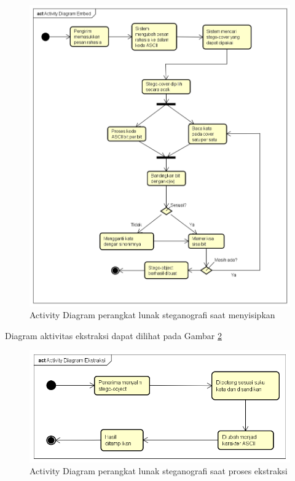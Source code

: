 \begin{figure}[H]
	\centering
	\includegraphics[scale=0.4]{Gambar/activity-penyisipan}
	\caption{Activity Diagram perangkat lunak steganografi saat menyisipkan} 
	\label{fig:4_activity-penyisipan}
\end{figure}

Diagram aktivitas ekstraksi dapat dilihat pada Gambar \ref{fig:4_activity-ekstraksi}

\begin{figure}[H]
	\centering
	\includegraphics[scale=0.5]{Gambar/activity-ekstraksi}
	\caption{Activity Diagram perangkat lunak steganografi saat proses ekstraksi} 
	\label{fig:4_activity-ekstraksi}
\end{figure}

